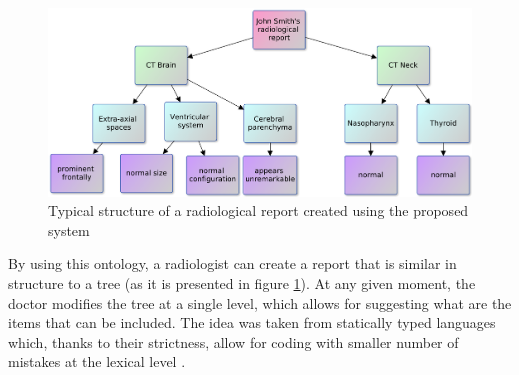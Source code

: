 \documentclass[12pt, twoside, openany]{report}
\theoremstyle{definition}
\begin{document}
\begin{figure}
    \centering
    \includegraphics[width=\linewidth]{report-tree.pdf}
    \caption{Typical structure of a radiological report created  using the proposed system\protect\footnotemark} 
    \label{fig:report-tree}
\end{figure}

By using this ontology, a radiologist can create a report that is similar in structure to a tree (as it is presented in figure \ref{fig:report-tree}). At any given moment, the doctor modifies the tree at a single level, which allows for suggesting what are the items that can be included. The idea was taken from statically typed languages which, thanks to their strictness, allow for coding with smaller number of mistakes at the lexical level \cite{static-lang}.
\end{document}
